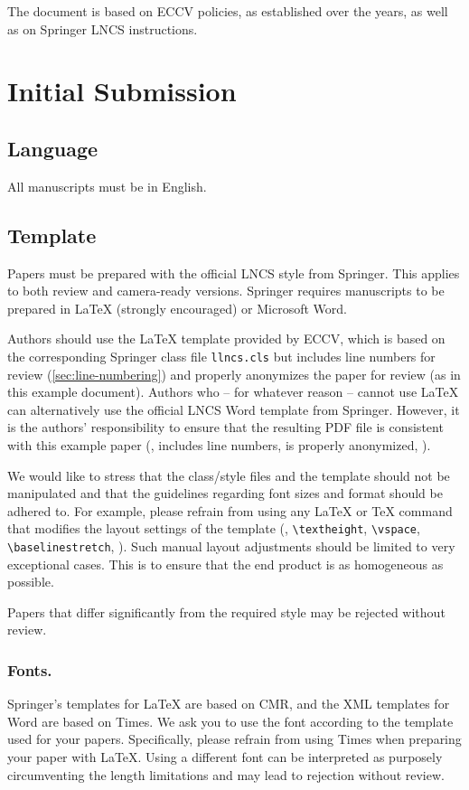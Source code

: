 \documentclass[runningheads]{llncs}
\begin{document}
The document is based on ECCV policies, as established over the years, as well as on Springer LNCS instructions.

\section{Initial Submission}

\subsection{Language}
All manuscripts must be in English.


\subsection{Template}
Papers must be prepared with the official LNCS style from Springer.
This applies to both review and camera-ready versions.
Springer requires manuscripts to be prepared in \LaTeX{} (strongly encouraged) or Microsoft Word. 

Authors should use the \LaTeX{} template provided by ECCV, which is based on the corresponding Springer class file \texttt{llncs.cls} but includes line numbers for review (\cref{sec:line-numbering}) and properly anonymizes the paper for review (as in this example document).
Authors who -- for whatever reason -- cannot use \LaTeX{} can alternatively use the official LNCS Word template from Springer.
However, it is the authors' responsibility to ensure that the resulting PDF file is consistent with this example paper (\ie, includes line numbers, is properly anonymized, \etc).

We would like to stress that the class/style files and the template should not be manipulated and that the guidelines regarding font sizes and format should be adhered to. 
For example, please refrain from using any \LaTeX{} or \TeX{} command that modifies the layout settings of the template (\eg, \verb+\textheight+, \verb+\vspace+, \verb+\baselinestretch+, \etc).
Such manual layout adjustments should be limited to very exceptional cases.
This is to ensure that the end product is as homogeneous as possible.

Papers that differ significantly from the required style may be rejected without review.


\subsubsection{Fonts.}
Springer's templates for \LaTeX{} are based on CMR, and the XML templates for Word are based on Times. 
We ask you to use the font according to the template used for your papers. 
Specifically, please refrain from using Times when preparing your paper with \LaTeX{}.
Using a different font can be interpreted as purposely circumventing the length limitations and may lead to rejection without review.
\end{document}
